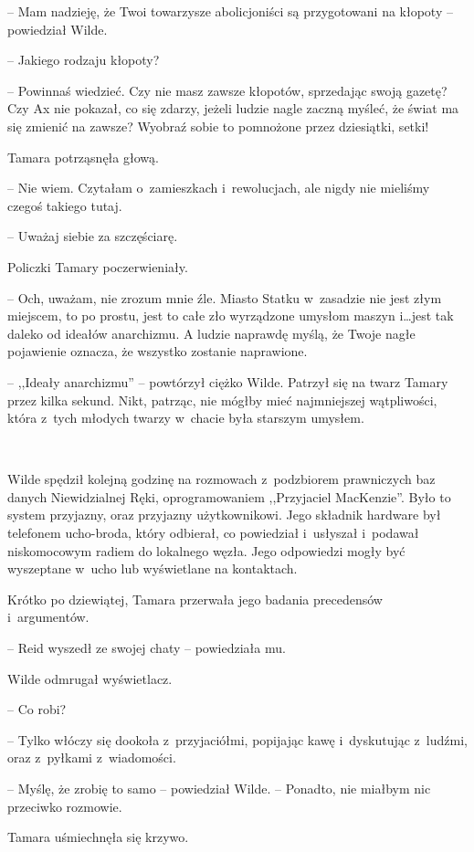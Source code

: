 \documentclass[oneside,polish,11pt,sfheadings]{mwbk}
\begin{document}
-- Mam nadzieję, że Twoi towarzysze abolicjoniści są przygotowani na
kłopoty -- powiedział Wilde.

-- Jakiego rodzaju kłopoty?

-- Powinnaś wiedzieć. Czy nie masz zawsze kłopotów, sprzedając swoją
gazetę? Czy Ax nie pokazał, co się zdarzy, jeżeli ludzie nagle zaczną
myśleć, że świat ma się zmienić na zawsze? Wyobraź sobie to pomnożone
przez dziesiątki, setki!

Tamara potrząsnęła głową. 

-- Nie wiem. Czytałam o~zamieszkach i~rewolucjach, ale nigdy nie mieliśmy czegoś takiego tutaj.

-- Uważaj siebie za szczęściarę.

Policzki Tamary poczerwieniały. 

-- Och, uważam, nie zrozum mnie źle.
Miasto Statku w~zasadzie nie jest złym miejscem, to po prostu, jest to
całe zło wyrządzone umysłom maszyn i\ldots jest tak daleko od ideałów
anarchizmu. A ludzie naprawdę myślą, że Twoje nagłe pojawienie oznacza,
że wszystko zostanie naprawione.

-- ,,Ideały anarchizmu'' -- powtórzył ciężko Wilde. Patrzył się na twarz
Tamary przez kilka sekund. Nikt, patrząc, nie mógłby mieć najmniejszej
wątpliwości, która z~tych młodych twarzy w~chacie była starszym umysłem.

~

Wilde spędził kolejną godzinę na rozmowach z~podzbiorem prawniczych baz
danych Niewidzialnej Ręki, oprogramowaniem ,,Przyjaciel MacKenzie''. Było
to system przyjazny, oraz przyjazny użytkownikowi. Jego składnik
hardware był telefonem ucho-broda, który odbierał, co powiedział i~usłyszał i~podawał niskomocowym radiem do lokalnego węzła. Jego
odpowiedzi mogły być wyszeptane w~ucho lub wyświetlane na kontaktach.

Krótko po dziewiątej, Tamara przerwała jego badania precedensów i~argumentów.

-- Reid wyszedł ze swojej chaty -- powiedziała mu.

Wilde odmrugał wyświetlacz.

-- Co robi?

-- Tylko włóczy się dookoła z~przyjaciółmi, popijając kawę i~dyskutując z~ludźmi, oraz z~pyłkami z~wiadomości.

-- Myślę, że zrobię to samo -- powiedział Wilde. -- Ponadto, nie miałbym
nic przeciwko rozmowie.

Tamara uśmiechnęła się krzywo. 
\end{document}
